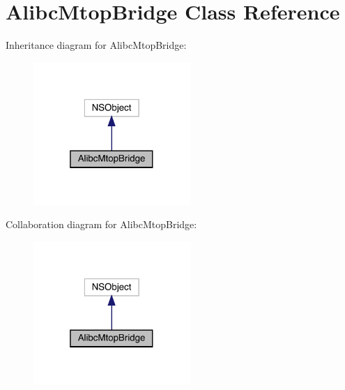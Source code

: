 \hypertarget{interface_alibc_mtop_bridge}{}\section{Alibc\+Mtop\+Bridge Class Reference}
\label{interface_alibc_mtop_bridge}


Inheritance diagram for Alibc\+Mtop\+Bridge\+:\nopagebreak
\begin{figure}[H]
\begin{center}
\leavevmode
\includegraphics[width=169pt]{interface_alibc_mtop_bridge__inherit__graph}
\end{center}
\end{figure}


Collaboration diagram for Alibc\+Mtop\+Bridge\+:\nopagebreak
\begin{figure}[H]
\begin{center}
\leavevmode
\includegraphics[width=169pt]{interface_alibc_mtop_bridge__coll__graph}
\end{center}
\end{figure}
